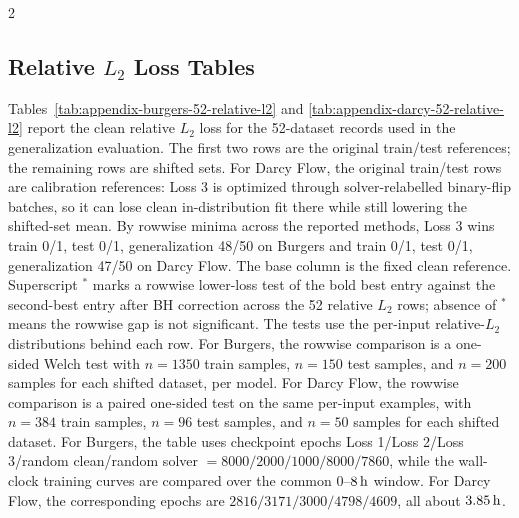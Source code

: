\documentclass[letterpaper]{article} %
\begin{document}
\begin{multicols}{2}
\subsection*{Relative $L_2$ Loss Tables}

Tables~\ref{tab:appendix-burgers-52-relative-l2} and
\ref{tab:appendix-darcy-52-relative-l2} report the clean relative $L_2$ loss for
the 52-dataset records used in the generalization evaluation.  The first two
rows are the original train/test references; the remaining rows are shifted
sets.  For Darcy Flow, the original train/test rows are calibration references:
Loss 3 is optimized through solver-relabelled binary-flip batches, so it can
lose clean in-distribution fit there while still lowering the shifted-set mean.
By rowwise minima across the reported methods, Loss 3 wins train 0/1, test 0/1, generalization 48/50 on Burgers and train 0/1, test 0/1, generalization 47/50 on Darcy Flow.  The base column is the fixed clean reference.
Superscript \(^{*}\) marks a rowwise lower-loss test of the bold best entry
against the second-best entry after BH correction across the 52 relative \(L_2\)
rows; absence of \(^{*}\) means the rowwise gap is not significant.  The tests
use the per-input relative-\(L_2\) distributions behind each row.  For
Burgers, the rowwise comparison is a one-sided Welch test with \(n=1350\)
train samples, \(n=150\) test samples, and \(n=200\) samples for each shifted
dataset, per model.  For Darcy Flow, the rowwise comparison is a paired
one-sided test on the same per-input examples, with \(n=384\) train samples,
\(n=96\) test samples, and \(n=50\) samples for each shifted dataset.
For Burgers, the table uses checkpoint epochs
Loss 1/Loss 2/Loss 3/random clean/random solver
\(=8000/2000/1000/8000/7860\), while the wall-clock training curves are compared
over the common \(0\)--\(8\,{\rm h}\) window.  For Darcy Flow, the corresponding
epochs are \(2816/3171/3000/4798/4609\), all about \(3.85\,{\rm h}\).

\end{multicols}
\clearpage
\begingroup
\footnotesize
\setlength{\tabcolsep}{2.0pt}
\renewcommand{\arraystretch}{1.08}
\end{document}
